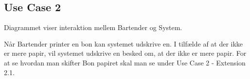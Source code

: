 \subsection{Use Case 2}
Diagrammet viser interaktion mellem Bartender og System.


Når Bartender printer en bon kan systemet udskrive en. I tilfælde af at der ikke er mere papir, vil systemet udskrive en besked om, at der ikke er mere papir.
\newline\newline
For at se hvordan man skifter Bon papiret skal man se under Use Case 2 - Extension 2.1.
